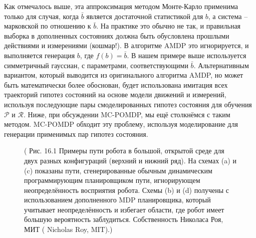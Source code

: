 \documentclass[10pt,a4paper]{article}
\begin{document}
Как отмечалось выше, эта аппроксимация методом Монте-Карло применима только для случая, когда
$\bar{b}$ является достаточной статистикой для $b$, а система – марковской по отношению к $\bar{b}$. На практике это обычно не так, и правильная выборка в дополненных состояниях должна быть обусловлена прошлыми действиями и измерениями (кошмар!). В алгоритме AMDP это игнорируется, и выполняется генерация $b$, где $f (b) =  \bar{b}$.  В нашем примере выше используется симметричный гауссиан, с параметрами, соответствующими $\bar{b}$. Альтернативным вариантом, который выводится из оригинального алгоритма AMDP, но может быть математически более обоснован, будет использована имитация всех траекторий гипотез состояний на основе модели движений и измерений, используя последующие пары смоделированных гипотез состояния для обучения $\mathcal{P}$ и $\mathcal{R}$.  Ниже, при обсуждении MC-POMDP, мы ещё столкнёмся с таким методом. MC-POMDP обходит эту проблему, используя моделирование для генерации применимых пар гипотез состояния. 

\begin{figure}[H]
	\caption{ ( Рис. 16.1 Примеры пути робота в большой, открытой среде для двух разных конфигураций (верхний и нижний ряд). На схемах (a) и (c) показаны пути, сгенерированные обычным динамическим программирующим планировщиком пути, игнорирующем неопределённость восприятия робота. Схемы (b) и (d) получены с использованием дополненного MDP планировщика, который учитывает неопределённость и избегает области, где робот имеет большую вероятность заблудиться. Собственность Николаса Роя, МИТ ( Nicholas Roy, MIT).) }
	\label{fig:161orig}
\end{figure}
\end{document}
